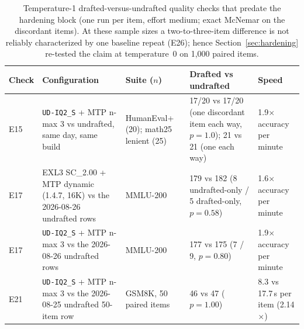 \documentclass[11pt]{article}
\newcommand{\q}[1]{\texttt{#1}}
\begin{document}
\begin{table}[htbp]
\centering
\scriptsize
\setlength{\tabcolsep}{4pt}
\begin{tabular}{lL{4.3cm}L{2.7cm}L{4.6cm}L{2.5cm}}
\toprule
Check & Configuration & Suite ($n$) & Drafted vs undrafted & Speed \\
\midrule
E15 & \q{UD-IQ2\_S} + MTP n-max 3 vs undrafted, same day, same build & HumanEval+ (20); math25 lenient (25) & 17/20 vs 17/20 (one discordant item each way, $p=1.0$); 21 vs 21 (one each way) & 1.9$\times$ accuracy per minute \\
E17 & EXL3 SC\_2.00 + MTP dynamic (1.4.7, 16K) vs the 2026-08-26 undrafted rows & MMLU-200 & 179 vs 182 (8 undrafted-only / 5 drafted-only, $p=0.58$) & 1.6$\times$ accuracy per minute \\
E17 & \q{UD-IQ2\_S} + MTP n-max 3 vs the 2026-08-26 undrafted rows & MMLU-200 & 177 vs 175 (7 / 9, $p=0.80$) & 1.9$\times$ accuracy per minute \\
E21 & \q{UD-IQ2\_S} + MTP n-max 3 vs the 2026-08-25 undrafted 50-item row & GSM8K, 50 paired items & 46 vs 47 ($p=1.00$) & 8.3 vs 17.7\,s per item (2.14$\times$) \\
\bottomrule
\end{tabular}
\caption{Temperature-1 drafted-versus-undrafted quality checks that predate
the hardening block (one run per item, effort medium; exact McNemar on the
discordant items). At these sample sizes a two-to-three-item difference is
not reliably characterized by one baseline repeat (E26); hence
Section~\ref{sec:hardening} re-tested the claim at temperature~0 on 1,000
paired items.}
\label{tab:t1quality}
\end{table}
\end{document}
